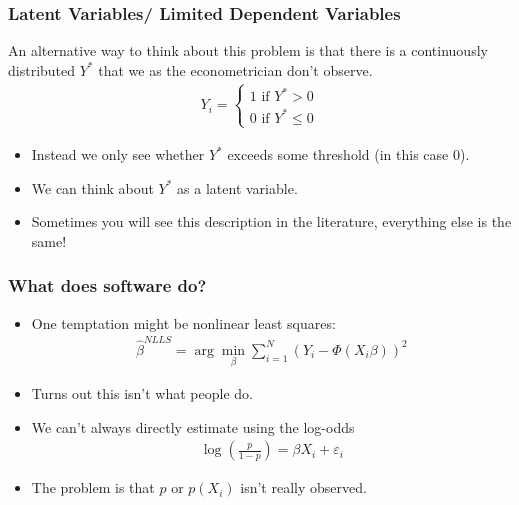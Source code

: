 \documentclass[aspectratio=169,11pt]{beamer}
\begin{document}

\begin{frame}
\frametitle{Latent Variables/ Limited Dependent Variables}
An alternative way to think about this problem is that there is a continuously distributed $Y^{*}$ that we as the econometrician don't observe.
\begin{align*}
Y_i =
\begin{cases}
1 \mbox{ if } Y^{*} >0 \\
0 \mbox{ if } Y^{*} \leq 0
\end{cases}
\end{align*}
\begin{itemize}
\item Instead we only see whether $Y^{*}$ exceeds some threshold (in this case $0$).
\item We can think about $Y^{*}$ as a \alert{latent variable}.
\item Sometimes you will see this description in the literature, everything else is the same!
\end{itemize}
\end{frame}




\begin{frame}
\frametitle{What does software do?}
\begin{itemize}
\item One temptation might be \alert{nonlinear least squares}:
\begin{align*}
\hat{\beta}^{NLLS} = \arg \min_{\beta} \sum_{i=1}^N (Y_i - \Phi(X_i \beta))^2
\end{align*}
\item Turns out this isn't what people do.
\item We can't always directly estimate using the log-odds
\begin{align*}
\log\left(\frac{p}{1-p}\right)= \beta X_i + \varepsilon_i
\end{align*}
\item The problem is that $p$ or $p(X_i)$ isn't really observed.
\end{itemize}
\end{frame}
\end{document}
